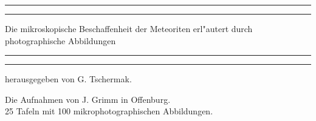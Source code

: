 \documentclass[a4paper, 11pt, oneside, polutonikogreek, german]{article}
\begin{document}
\begin{titlepage} %
	\centering %
	\scshape %

	
	\rule{\textwidth}{1.6pt}\vspace*{-\baselineskip}\vspace*{2pt} %
	\rule{\textwidth}{0.4pt} %
	
	\vspace{0.75\baselineskip} %

        {\Huge Die mikroskopische Beschaffenheit der Meteoriten erl"autert durch photographische Abbildungen} %
	
	\vspace{0.75\baselineskip} %
	
	\rule{\textwidth}{0.4pt}\vspace*{-\baselineskip}\vspace{3.2pt} %
	\rule{\textwidth}{1.6pt} %
	
	\vspace{1\baselineskip} %
	
	
	{\Large herausgegeben von G. Tschermak.} %
	
	\vspace*{1\baselineskip} %
	

 	{Die Aufnahmen von J. Grimm in Offenburg.\\ 25 Tafeln mit 100 mikrophotographischen Abbildungen.} %

	\vspace{1\baselineskip} %

	
	

\end{titlepage}
\end{document}
